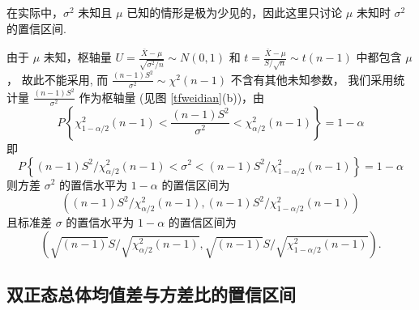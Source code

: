 在实际中，$\sigma^{2} $ 未知且 $ \mu $ 已知的情形是极为少见的，因此这里只讨论 $ \mu $ 未知时 $ \sigma^{2} $ 的置信区间.

\begin{theorem}
    由于 $ \mu $ 未知，枢轴量 $\displaystyle U=\frac{\bar{X}-\mu}{\sqrt{\sigma^{2} / n}} \sim N(0,1) $ 和 $\displaystyle t=\frac{\bar{X}-\mu}{S / \sqrt{n}} \sim t(n-1) $ 中都包含 $ \mu$，
    故此不能采用, 而 $\displaystyle \frac{(n-1) S^{2}}{\sigma^{2}} \sim \chi^{2}(n-1) $ 不含有其他未知参数，
    我们采用统计量 $\displaystyle \frac{(n-1) S^{2}}{\sigma^{2}} $ 作为枢轴量 (见图 \ref{tfweidian}(b))，由
    $$P\left\{\chi_{1-\alpha / 2}^{2}(n-1)<\frac{(n-1) S^{2}}{\sigma^{2}}<\chi_{\alpha / 2}^{2}(n-1)\right\}=1-\alpha$$
    即
    $$P\left\{(n-1) S^{2} / \chi_{\alpha / 2}^{2}(n-1)<\sigma^{2}<(n-1) S^{2} / \chi_{1-\alpha / 2}^{2}(n-1)\right\}=1-\alpha$$
    则方差 $ \sigma^{2} $ 的置信水平为 $ 1-\alpha $ 的置信区间为
    $$\left((n-1) S^{2} / \chi_{\alpha / 2}^{2}(n-1),(n-1) S^{2} / \chi_{1-\alpha / 2}^{2}(n-1)\right)$$
    且标准差 $ \sigma $ 的置信水平为 $ 1-\alpha $ 的置信区间为
    $$\left(\sqrt{(n-1)} S / \sqrt{\chi_{\alpha / 2}^{2}(n-1)}, \sqrt{(n-1)} S / \sqrt{\chi_{1-\alpha / 2}^{2}(n-1)}\right) .$$
\end{theorem}

\subsection{双正态总体均值差与方差比的置信区间}


